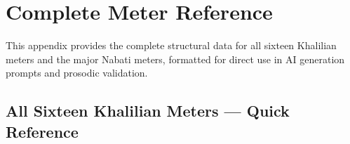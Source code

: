 \chapter{Complete Meter Reference}
\label{app:meters_reference}

This appendix provides the complete structural data for all sixteen Khalilian meters and the major Nabati meters, formatted for direct use in AI generation prompts and prosodic validation.

\section{All Sixteen Khalilian Meters — Quick Reference}
\label{app:khalilian_quick}

